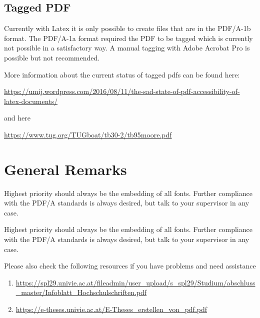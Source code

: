 \documentclass{article}
\begin{document}
\subsection{Tagged PDF}
Currently with Latex it is only possible to create files that are in the PDF/A-1b format. The PDF/A-1a format required the PDF to be tagged which is currently not possible in a satisfactory way.
A manual tagging with Adobe Acrobat Pro is possible but not recommended.

More information about the current status of tagged pdfs can be found here:

\url{https://umij.wordpress.com/2016/08/11/the-sad-state-of-pdf-accessibility-of-latex-documents/} 

and here

\url{https://www.tug.org/TUGboat/tb30-2/tb95moore.pdf}

\section{General Remarks}
Highest priority should always be the embedding of all fonts. Further compliance with the PDF/A standards is always desired, but talk to your supervisor in any case.

Highest priority should always be the embedding of all fonts. Further compliance with the PDF/A standards is always desired, but talk to your supervisor in any case.

Please also check the following resources if you have problems and need assistance

\begin{enumerate}
\item \url{https://spl29.univie.ac.at/fileadmin/user_upload/s_spl29/Studium/abschluss_master/Infoblatt_Hochschulschriften.pdf} 
\item \url{https://e-theses.univie.ac.at/E-Theses_erstellen_von_pdf.pdf}
\end{enumerate}
\end{document}
